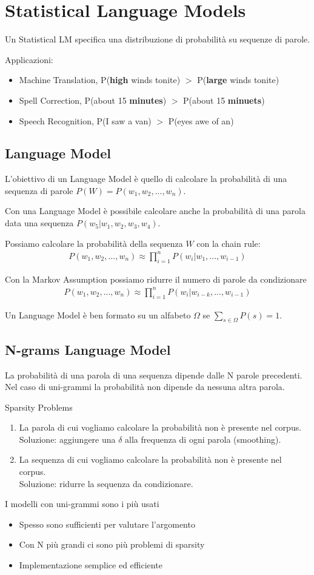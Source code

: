 \chapter{Statistical Language Models}
Un Statistical LM specifica una distribuzione di probabilità su sequenze di parole.

Applicazioni:
\begin{itemize}
  \item Machine Translation, P(\textbf{high} winds tonite) $>$ P(\textbf{large} winds tonite)
  \item Spell Correction, P(about 15 \textbf{minutes}) $>$ P(about 15 \textbf{minuets})
  \item Speech Recognition, P(I saw a van) $>$ P(eyes awe of an)
\end{itemize}

\section{Language Model}
L'obiettivo di un Language Model è quello di calcolare la probabilità di una sequenza di parole $P(W) = P(w_1, w_2, ..., w_n)$.

Con una Language Model è possibile calcolare anche la probabilità di una parola data una sequenza $P(w_5 | w_1, w_2, w_3, w_4)$.

Possiamo calcolare la probabilità della sequenza $W$ con la chain rule:
\begin{align*}
  P(w_1, w_2, ..., w_n) \approx \prod_{i=1}^n {P(w_i | w_1, ..., w_{i-1})}
\end{align*}

Con la Markov Assumption possiamo ridurre il numero di parole da condizionare
\begin{align*}
  P(w_1, w_2, ..., w_n) \approx \prod_{i=1}^n {P(w_i | w_{i-k}, ..., w_{i-1})}
\end{align*}

Un Language Model è ben formato su un alfabeto $\Omega$ se $\displaystyle \sum_{s\in\Omega}P(s)=1$.

\section*{N-grams Language Model}
La probabilità di una parola di una sequenza dipende dalle N parole precedenti.
Nel caso di uni-grammi la probabilità non dipende da nessuna altra parola. 

Sparsity Problems
\begin{enumerate}
  \item La parola di cui vogliamo calcolare la probabilità non è presente nel corpus.\\ Soluzione: aggiungere una $\delta$ alla frequenza di ogni parola (smoothing).
  \item La sequenza di cui vogliamo calcolare la probabilità non è presente nel corpus.\\ Soluzione: ridurre la sequenza da condizionare.
\end{enumerate}

I modelli con uni-grammi sono i più usati
\begin{itemize}
  \item Spesso sono sufficienti per valutare l'argomento
  \item Con N più grandi ci sono più problemi di sparsity
  \item Implementazione semplice ed efficiente
\end{itemize}

